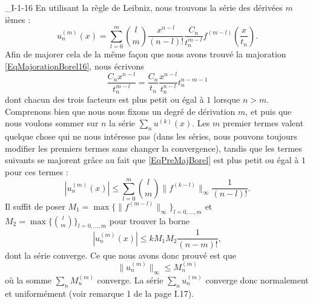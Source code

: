 \begin{corrige}{_I-1-16}
	En utilisant la règle de Leibniz, nous trouvons la série des dérivées $m$ièmes :
	\begin{equation}
		u_n^{(m)}(x)=\sum_{l=0}^m {l\choose m} \frac{ x^{n-l} }{ (n-l)! }\frac{ C_n }{ t_n^{m-l} }f^{(m-l)}(\frac{ x }{ t_n }).
	\end{equation}
	Afin de majorer cela de la même façon que nous avons trouvé la majoration \eqref{EqMajorationBorel16}, nous écrivons
	\begin{equation}		\label{EqPreMajBorel}
		\frac{ C_nx^{n-l} }{ t_n^{m-l} }=\frac{ C_n }{ t_n }\frac{ x^{n-l} }{ t_n^{n-l} }t_n^{n-m-1}
	\end{equation}
	dont chacun des trois facteurs est plus petit ou égal à $1$ lorsque $n>m$. Comprenons bien que nous nous fixons un degré de dérivation $m$, et puis que nous voulons sommer sur $n$ la série $\sum_n u^{(k)}(x)$. Les $m$ premier termes valent quelque chose qui ne nous intéresse pas (dans les séries, nous pouvons toujours modifier les premiers termes sans changer la convergence), tandis que les termes suivants se majorent grâce au fait que \eqref{EqPreMajBorel} est plus petit ou égal à $1$ pour ces termes :
	\begin{equation}
		| u_n^{(m)}(x) |\leq \sum_{l=0}^m{l\choose m} \| f^{(k-l)} \|_{\infty}\frac{1}{ (n-l)! }.
	\end{equation}
	Il suffit de poser $M_1=\max\{ \| f^{(m-l)} \|_{\infty} \}_{l=0,\ldots,m}$ et $M_2=\max\{ {l\choose m} \}_{l=0,\ldots,m}$ pour trouver la borne
	\begin{equation}
		| u_n^{(m)}(x) |\leq kM_1M_2\frac{1}{ (n-m)! },
	\end{equation}
	dont la série converge. Ce que nous avons donc prouvé est que
	\begin{equation}
		\| u_n^{(m)} \|_{\infty}\leq M_n^{(m)}
	\end{equation}
	où la somme $\sum_nM_n^{(m)}$ converge. La série $\sum_nu_n^{(m)}$ converge donc normalement et uniformément (voir remarque 1 de la page I.17).


\end{corrige}
